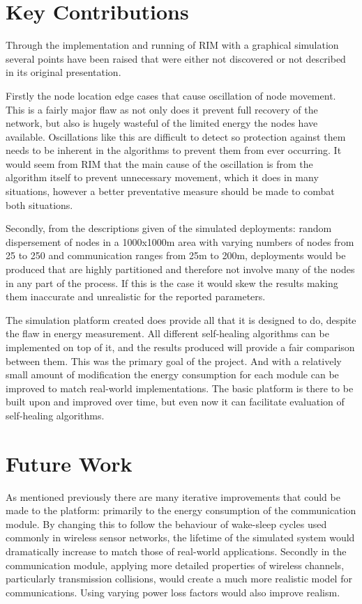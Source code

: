 \documentclass[authoryearcitations]{UoYCSproject}
\begin{document}
\section{Key Contributions}
\label{sec:keyContrib}

Through the implementation and running of RIM with a graphical simulation several points have been raised that were either not discovered or not described in its original presentation.

Firstly the node location edge cases that cause oscillation of node movement. This is a fairly major flaw as not only does it prevent full recovery of the network, but also is hugely wasteful of the limited energy the nodes have available. Oscillations like this are difficult to detect so protection against them needs to be inherent in the algorithms to prevent them from ever occurring. It would seem from RIM that the main cause of the oscillation is from the algorithm itself to prevent unnecessary movement, which it does in many situations, however a better preventative measure should be made to combat both situations.

Secondly, from the descriptions given of the simulated deployments: random dispersement of nodes in a 1000x1000m area with varying numbers of nodes from 25 to 250 and communication ranges from 25m to 200m, deployments would be produced that are highly partitioned and therefore not involve many of the nodes in any part of the process. If this is the case it would skew the results making them inaccurate and unrealistic for the reported parameters.

The simulation platform created does provide all that it is designed to do, despite the flaw in energy measurement. All different self-healing algorithms can be implemented on top of it, and the results produced will provide a fair comparison between them. This was the primary goal of the project. And with a relatively small amount of modification the energy consumption for each module can be improved to match real-world implementations. The basic platform is there to be built upon and improved over time, but even now it can facilitate evaluation of self-healing algorithms.

\section{Future Work}
As mentioned previously there are many iterative improvements that could be made to the platform: primarily to the energy consumption of the communication module. By changing this to follow the behaviour of wake-sleep cycles used commonly in wireless sensor networks, the lifetime of the simulated system would dramatically increase to match those of real-world applications. Secondly in the communication module, applying more detailed properties of wireless channels, particularly transmission collisions, would create a much more realistic model for communications. Using varying power loss factors would also improve realism.
\end{document}
